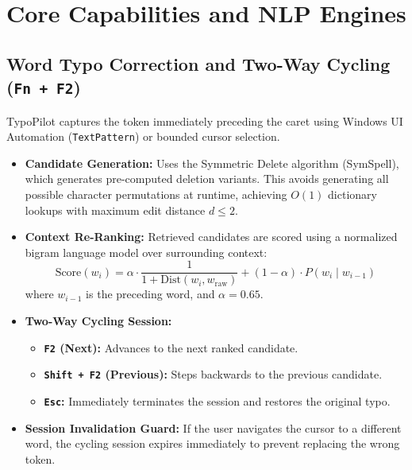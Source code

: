 \documentclass[11pt,a4paper]{article}
\begin{document}
\section{Core Capabilities and NLP Engines}

\subsection{Word Typo Correction and Two-Way Cycling (\texttt{Fn + F2})}
TypoPilot captures the token immediately preceding the caret using Windows UI Automation (\texttt{TextPattern}) or bounded cursor selection. 

\begin{itemize}
    \item \textbf{Candidate Generation:} Uses the Symmetric Delete algorithm (SymSpell), which generates pre-computed deletion variants. This avoids generating all possible character permutations at runtime, achieving $O(1)$ dictionary lookups with maximum edit distance $d \le 2$.
    \item \textbf{Context Re-Ranking:} Retrieved candidates are scored using a normalized bigram language model over surrounding context:
    \begin{equation}
        \text{Score}(w_i) = \alpha \cdot \frac{1}{1 + \text{Dist}(w_i, w_{\text{raw}})} + (1 - \alpha) \cdot P(w_i \mid w_{i-1})
    \end{equation}
    where $w_{i-1}$ is the preceding word, and $\alpha = 0.65$.
    \item \textbf{Two-Way Cycling Session:}
    \begin{itemize}
        \item \textbf{\texttt{F2} (Next):} Advances to the next ranked candidate.
        \item \textbf{\texttt{Shift + F2} (Previous):} Steps backwards to the previous candidate.
        \item \textbf{\texttt{Esc}:} Immediately terminates the session and restores the original typo.
    \end{itemize}
    \item \textbf{Session Invalidation Guard:} If the user navigates the cursor to a different word, the cycling session expires immediately to prevent replacing the wrong token.
\end{itemize}
\end{document}
